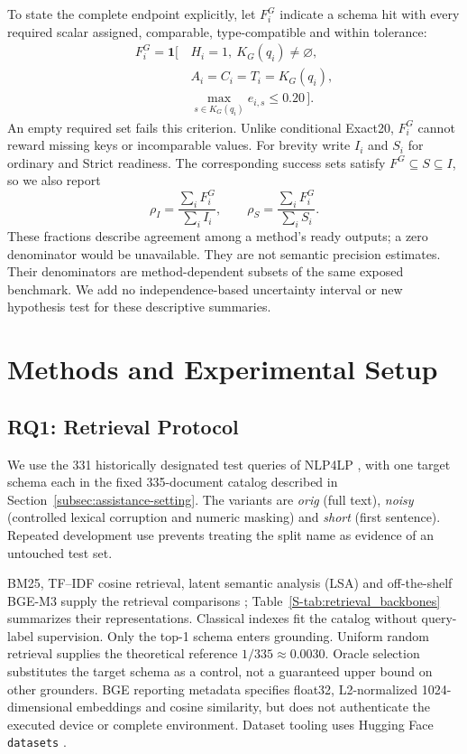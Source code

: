 \documentclass[pdflatex,iicol,sn-basic,Numbered]{sn-jnl}
\begin{document}
To state the complete endpoint explicitly, let $F_i^G$ indicate a schema hit with every required scalar assigned, comparable, type-compatible and within tolerance:
\begin{equation}
\begin{split}
F_i^G=\mathbf{1}[\,&H_i=1,\ K_G(q_i)\ne\varnothing,\\
&A_i=C_i=T_i=K_G(q_i),\\
&\max_{s\in K_G(q_i)}e_{i,s}\leq0.20\,].
\end{split}\label{eq:full-scalar}
\end{equation}
An empty required set fails this criterion. Unlike conditional Exact20, $F_i^G$ cannot reward missing keys or incomparable values. For brevity write $I_i$ and $S_i$ for ordinary and Strict readiness. The corresponding success sets satisfy $F^G\subseteq S\subseteq I$, so we also report
\begin{equation}
\rho_I=\frac{\sum_i F_i^G}{\sum_i I_i},\qquad
\rho_S=\frac{\sum_i F_i^G}{\sum_i S_i}.
\label{eq:conditional-agreement}
\end{equation}
These fractions describe agreement among a method's ready outputs; a zero denominator would be unavailable. They are not semantic precision estimates. Their denominators are method-dependent subsets of the same exposed benchmark. We add no independence-based uncertainty interval or new hypothesis test for these descriptive summaries.

\section{Methods and Experimental Setup}
\label{sec:methodology}\label{sec:method}
\subsection{RQ1: Retrieval Protocol}
\label{subsec:method_retrieval}\label{subsec:exp_setup}
We use the 331 historically designated test queries of NLP4LP \cite{nlp4lp_dataset,ahmaditeshnizi2024optimus_icml}, with one target schema each in the fixed 335-document catalog described in Section~\ref{subsec:assistance-setting}. The variants are \emph{orig} (full text), \emph{noisy} (controlled lexical corruption and numeric masking) and \emph{short} (first sentence). Repeated development use prevents treating the split name as evidence of an untouched test set.

BM25, TF--IDF cosine retrieval, latent semantic analysis (LSA) and off-the-shelf BGE-M3 supply the retrieval comparisons \cite{robertson2009bm25,pedregosa2011sklearn,deerwester1990lsa,chen2024m3embedding}; Table~\ref{S-tab:retrieval_backbones} summarizes their representations. Classical indexes fit the catalog without query-label supervision. Only the top-1 schema enters grounding. Uniform random retrieval supplies the theoretical reference $1/335\approx0.0030$. Oracle selection substitutes the target schema as a control, not a guaranteed upper bound on other grounders. BGE reporting metadata specifies float32, L2-normalized 1024-dimensional embeddings and cosine similarity, but does not authenticate the executed device or complete environment. Dataset tooling uses Hugging Face \texttt{datasets} \cite{lhoest2021datasets}.
\end{document}
